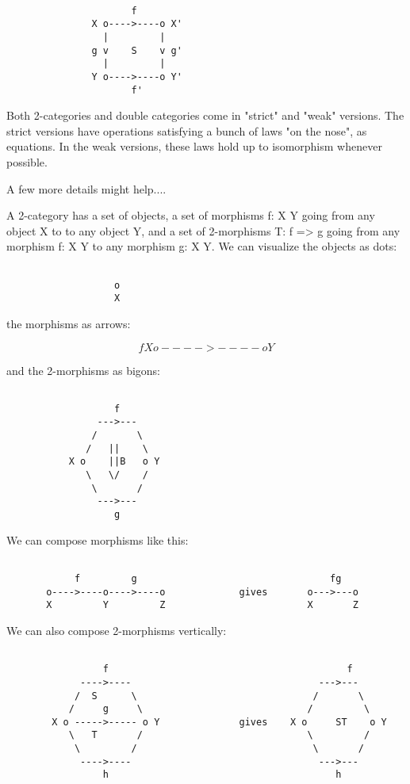 \begin{verbatim}

                      f
               X o---->----o X'
                 |         |
               g v    S    v g'
                 |         |
               Y o---->----o Y' 
                      f'
\end{verbatim}
    

Both 2-categories and double categories come in "strict" and
"weak" versions.  The strict versions have operations
satisfying a bunch of laws "on the nose", as equations.  In
the weak versions, these laws hold up to isomorphism whenever
possible.

A few more details might help....

A 2-category has a set of objects, a set of morphisms f: X \to  Y going 
from any object X to to any object Y, and a set of 2-morphisms T: f => g 
going from any morphism f: X \to  Y to any morphism g: X \to  Y.  We can 
visualize the objects as dots: 


\begin{verbatim}

                   o 
                   X
\end{verbatim}
    
the morphisms as arrows:


$$

                   f           
            X o---->----o Y
$$
    
and the 2-morphisms as bigons:


\begin{verbatim}

                   f 
                --->---
               /       \
              /   ||    \
           X o    ||B   o Y
              \   \/    /
               \       /
                --->---
                   g
\end{verbatim}
    

We can compose morphisms like this:


\begin{verbatim}

            f         g                                  fg
       o---->----o---->----o             gives       o--->---o
       X         Y         Z                         X       Z
\end{verbatim}
    

We can also compose 2-morphisms vertically:


\begin{verbatim}

                 f                                          f
             ---->----                                 --->---  
            /  S      \                               /       \
           /     g     \                             /         \
        X o ----->----- o Y              gives    X o     ST    o Y
           \   T       /                             \         /
            \         /                               \       /   
             ---->----                                 --->---
                 h                                        h
\end{verbatim}
    
